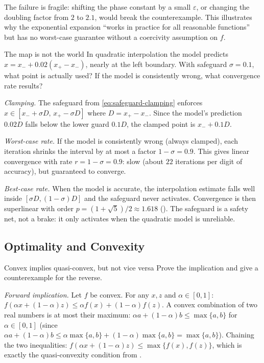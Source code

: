 The failure is fragile: shifting the phase constant by a small $\varepsilon$, or changing the doubling factor from $2$ to $2.1$, would break the counterexample.
This illustrates why the exponential expansion ``works in practice for all reasonable functions'' but has no worst-case guarantee without a coercivity assumption on $f$.

\begin{exercise}{The map is not the world}\label{ex:safeguard-sigma}
	In quadratic interpolation the model predicts $x = x_- + 0.02(x_+ - x_-)$, nearly at the left boundary.
	With safeguard $\sigma = 0.1$, what point is actually used?
	If the model is consistently wrong, what convergence rate results?
\end{exercise}

\solution
\textit{Clamping.}
The safeguard from \cref{eq:safeguard-clamping} enforces $x \in [x_- + \sigma D, \, x_+ - \sigma D]$ where $D = x_+ - x_-$.
Since the model's prediction $0.02 D$ falls below the lower guard $0.1 D$, the clamped point is $x_- + 0.1 D$.

\textit{Worst-case rate.}
If the model is consistently wrong (always clamped), each iteration shrinks the interval by at most a factor $1 - \sigma = 0.9$.
This gives linear convergence with rate $r = 1 - \sigma = 0.9$: slow (about $22$ iterations per digit of accuracy), but guaranteed to converge.

\textit{Best-case rate.}
When the model is accurate, the interpolation estimate falls well inside $[\sigma D, (1-\sigma)D]$ and the safeguard never activates.
Convergence is then superlinear with order $p = (1 + \sqrt{5})/2 \approx 1.618$ ().
The safeguard is a safety net, not a brake: it only activates when the quadratic model is unreliable.

\subsection{Optimality and Convexity}\label{app:ex-optimality}

\begin{exercise}{Convex implies quasi-convex, but not vice versa}\label{ex:convex-implies-quasiconvex}
	Prove the implication and give a counterexample for the reverse.
\end{exercise}

\solution
\textit{Forward implication.}
Let $f$ be convex.
For any $x, z$ and $\alpha \in [0, 1]$:
$f(\alpha x + (1-\alpha)z) \leq \alpha f(x) + (1-\alpha)f(z)$.
A convex combination of two real numbers is at most their maximum: $\alpha a + (1-\alpha)b \leq \max\{a, b\}$ for $\alpha \in [0,1]$ (since $\alpha a + (1-\alpha)b \leq \alpha \max\{a,b\} + (1-\alpha)\max\{a,b\} = \max\{a,b\}$).
Chaining the two inequalities:
$f(\alpha x + (1-\alpha)z) \leq \max\{f(x), f(z)\}$,
which is exactly the quasi-convexity condition from .

